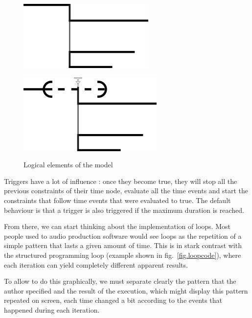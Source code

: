 \documentclass{sigchi}
\begin{document}
\begin{figure}[h]
	\centering
	\begin{minipage}[b]{.5\linewidth}
		\centering
		\includegraphics[scale=0.7]{images/events.png}
		\label{fig.logical.events}
	\end{minipage}\begin{minipage}[b]{.5\linewidth}
	\centering
	\includegraphics[scale=0.7]{images/trigger.png}
	\label{fig.logical.trigger}
    \end{minipage}	

\caption{Logical elements of the model}
\label{fig.logical}
\end{figure}	

Triggers have a lot of influence : once they become true, they will stop all the previous constraints of their time node, evaluate all the time events and start the constraints that follow time events that were evaluated to true. The default behaviour is that a trigger is also triggered if the maximum duration is reached.

From there, we can start thinking about the implementation of loops. Most people used to audio production software would see loops as the repetition of a simple pattern that lasts a given amount of time. This is in stark contrast with the structured programming loop (example shown in fig.~\ref{fig.loopcode}), where each iteration can yield completely different apparent results.

To allow to do this graphically, we must separate clearly the pattern that the author specified and the result of the execution, which might display this pattern repeated on screen, each time changed a bit according to the events that happened during each iteration.
\end{document}
